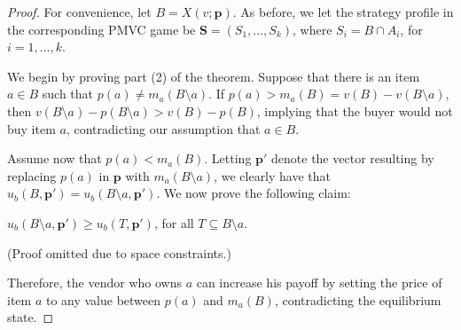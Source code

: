 \begin{proof}
For convenience, let $B=X(v;\mathbf{p})$. As before, we let the strategy profile in the corresponding PMVC game be $\mathbf{S}=(S_1,\ldots,S_k)$, where $S_i = B \cap A_i$, for $i=1,\ldots,k$.

We begin by proving part (2) of the theorem. Suppose that there is an item $a\in B$ such that $p(a) \neq m_{a}(B \setminus a)$. If $p(a) > m_{a}(B) = v(B)-v(B\setminus a)$, then $v(B\setminus a)- p(B\setminus a)>v(B)-p(B)$, implying that the buyer would not buy item $a$, contradicting our assumption that $a\in B$.

Assume now that $p(a) < m_{a}(B)$. Letting $\mathbf{p'}$ denote the vector resulting by replacing $p(a)$ in $\mathbf{p}$ with $m_a(B \setminus a)$, we clearly have that $u_b(B, \mathbf{p'}) = u_b(B \setminus a, \mathbf{p'})$. We now prove the following claim:
\begin{claim}
 $u_b(B\setminus a,\mathbf{p'}) \geq u_b(T,\mathbf{p'})$, for all $T \subseteq B \setminus a$.
\end{claim}
(Proof omitted due to space constraints.)

Therefore, the vendor who owns $a$ can increase his payoff by setting the price of item $a$ to any value between $p(a)$ and $m_a(B)$, contradicting the equilibrium state.



\end{proof}
